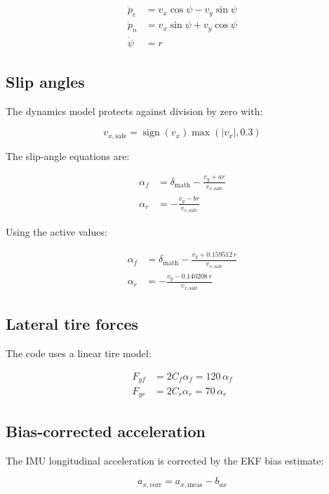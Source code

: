 \documentclass[11pt]{article}
\begin{document}
\begin{align}
\dot{p}_e &= v_x\cos\psi - v_y\sin\psi \\
\dot{p}_n &= v_x\sin\psi + v_y\cos\psi \\
\dot{\psi} &= r
\end{align}

\subsection{Slip angles}

The dynamics model protects against division by zero with:

\begin{equation}
v_{x,\text{safe}} = \operatorname{sign}(v_x)\max(|v_x|, 0.3)
\end{equation}

The slip-angle equations are:

\begin{align}
\alpha_f &= \delta_{\text{math}} - \frac{v_y + ar}{v_{x,\text{safe}}} \\
\alpha_r &= -\frac{v_y - br}{v_{x,\text{safe}}}
\end{align}

Using the active values:

\begin{align}
\alpha_f &= \delta_{\text{math}} - \frac{v_y + 0.159512\,r}{v_{x,\text{safe}}} \\
\alpha_r &= -\frac{v_y - 0.140208\,r}{v_{x,\text{safe}}}
\end{align}

\subsection{Lateral tire forces}

The code uses a linear tire model:

\begin{align}
F_{yf} &= 2C_f\alpha_f = 120\,\alpha_f \\
F_{yr} &= 2C_r\alpha_r = 70\,\alpha_r
\end{align}

\subsection{Bias-corrected acceleration}

The IMU longitudinal acceleration is corrected by the EKF bias estimate:

\begin{equation}
a_{x,\text{corr}} = a_{x,\text{meas}} - b_{ax}
\end{equation}
\end{document}
